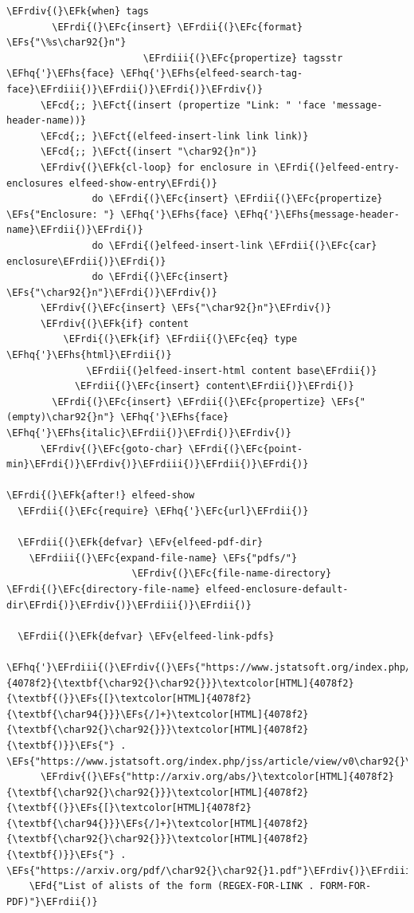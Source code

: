 \documentclass{scrartcl}
\newcommand{\EFk}[1]{\textcolor{EFk}{#1}} %
\newcommand{\EFd}[1]{\textcolor{EFd}{\textit{#1}}} %
\newcommand{\EFs}[1]{\textcolor{EFs}{#1}} %
\newcommand{\EFct}[1]{\textcolor{EFct}{#1}} %
\newcommand{\EFc}[1]{\textcolor{EFc}{#1}} %
\newcommand{\EFv}[1]{\textcolor{EFv}{#1}} %
\newcommand{\EFcd}[1]{\textcolor{EFcd}{#1}} %
\newcommand{\EFhq}[1]{\textcolor{EFhq}{#1}} %
\newcommand{\EFhs}[1]{\textcolor{EFhs}{#1}} %
\newcommand{\EFrdi}[1]{\textcolor{EFrdi}{#1}} %
\newcommand{\EFrdii}[1]{\textcolor{EFrdii}{#1}} %
\newcommand{\EFrdiii}[1]{\textcolor{EFrdiii}{#1}} %
\newcommand{\EFrdiv}[1]{\textcolor{EFrdiv}{#1}} %
\begin{document}
\begin{Code}
\begin{Verbatim}[]
      \EFrdiv{(}\EFk{when} tags
        \EFrdi{(}\EFc{insert} \EFrdii{(}\EFc{format} \EFs{"\%s\char92{}n"}
                        \EFrdiii{(}\EFc{propertize} tagsstr \EFhq{'}\EFhs{face} \EFhq{'}\EFhs{elfeed-search-tag-face}\EFrdiii{)}\EFrdii{)}\EFrdi{)}\EFrdiv{)}
      \EFcd{;; }\EFct{(insert (propertize "Link: " 'face 'message-header-name))}
      \EFcd{;; }\EFct{(elfeed-insert-link link link)}
      \EFcd{;; }\EFct{(insert "\char92{}n")}
      \EFrdiv{(}\EFk{cl-loop} for enclosure in \EFrdi{(}elfeed-entry-enclosures elfeed-show-entry\EFrdi{)}
               do \EFrdi{(}\EFc{insert} \EFrdii{(}\EFc{propertize} \EFs{"Enclosure: "} \EFhq{'}\EFhs{face} \EFhq{'}\EFhs{message-header-name}\EFrdii{)}\EFrdi{)}
               do \EFrdi{(}elfeed-insert-link \EFrdii{(}\EFc{car} enclosure\EFrdii{)}\EFrdi{)}
               do \EFrdi{(}\EFc{insert} \EFs{"\char92{}n"}\EFrdi{)}\EFrdiv{)}
      \EFrdiv{(}\EFc{insert} \EFs{"\char92{}n"}\EFrdiv{)}
      \EFrdiv{(}\EFk{if} content
          \EFrdi{(}\EFk{if} \EFrdii{(}\EFc{eq} type \EFhq{'}\EFhs{html}\EFrdii{)}
              \EFrdii{(}elfeed-insert-html content base\EFrdii{)}
            \EFrdii{(}\EFc{insert} content\EFrdii{)}\EFrdi{)}
        \EFrdi{(}\EFc{insert} \EFrdii{(}\EFc{propertize} \EFs{"(empty)\char92{}n"} \EFhq{'}\EFhs{face} \EFhq{'}\EFhs{italic}\EFrdii{)}\EFrdi{)}\EFrdiv{)}
      \EFrdiv{(}\EFc{goto-char} \EFrdi{(}\EFc{point-min}\EFrdi{)}\EFrdiv{)}\EFrdiii{)}\EFrdii{)}\EFrdi{)}

\EFrdi{(}\EFk{after!} elfeed-show
  \EFrdii{(}\EFc{require} \EFhq{'}\EFc{url}\EFrdii{)}

  \EFrdii{(}\EFk{defvar} \EFv{elfeed-pdf-dir}
    \EFrdiii{(}\EFc{expand-file-name} \EFs{"pdfs/"}
                      \EFrdiv{(}\EFc{file-name-directory} \EFrdi{(}\EFc{directory-file-name} elfeed-enclosure-default-dir\EFrdi{)}\EFrdiv{)}\EFrdiii{)}\EFrdii{)}

  \EFrdii{(}\EFk{defvar} \EFv{elfeed-link-pdfs}
    \EFhq{'}\EFrdiii{(}\EFrdiv{(}\EFs{"https://www.jstatsoft.org/index.php/jss/article/view/v0}\textcolor[HTML]{4078f2}{\textbf{\char92{}\char92{}}}\textcolor[HTML]{4078f2}{\textbf{(}}\EFs{[}\textcolor[HTML]{4078f2}{\textbf{\char94{}}}\EFs{/]+}\textcolor[HTML]{4078f2}{\textbf{\char92{}\char92{}}}\textcolor[HTML]{4078f2}{\textbf{)}}\EFs{"} . \EFs{"https://www.jstatsoft.org/index.php/jss/article/view/v0\char92{}\char92{}1/v\char92{}\char92{}1.pdf"}\EFrdiv{)}
      \EFrdiv{(}\EFs{"http://arxiv.org/abs/}\textcolor[HTML]{4078f2}{\textbf{\char92{}\char92{}}}\textcolor[HTML]{4078f2}{\textbf{(}}\EFs{[}\textcolor[HTML]{4078f2}{\textbf{\char94{}}}\EFs{/]+}\textcolor[HTML]{4078f2}{\textbf{\char92{}\char92{}}}\textcolor[HTML]{4078f2}{\textbf{)}}\EFs{"} . \EFs{"https://arxiv.org/pdf/\char92{}\char92{}1.pdf"}\EFrdiv{)}\EFrdiii{)}
    \EFd{"List of alists of the form (REGEX-FOR-LINK . FORM-FOR-PDF)"}\EFrdii{)}


\end{Verbatim}
\end{Code}
\end{document}
